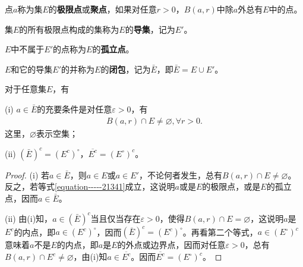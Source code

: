 \documentclass[../../main.tex]{subfiles}
\begin{document}
\begin{definition}
点\(a\)称为集\(E\)的\textbf{极限点}或\textbf{聚点}，如果对任意\(r > 0\)，\(B(a, r)\)中除\(a\)外总有\(E\)中的点。

集\(E\)的所有极限点构成的集称为\(E\)的\textbf{导集}，记为\(E'\)。

\(E\)中不属于\(E'\)的点称为\(E\)的\textbf{孤立点}。

\(E\)和它的导集\(E'\)的并称为\(E\)的\textbf{闭包}，记为\(\bar{E}\)，即\(\bar{E} = E \cup E'\)。
\end{definition}

\begin{proposition}\label{proposition:闭包的性质}
对于任意集\(E\)，有

(i) \(a \in \bar{E}\)的充要条件是对任意\(\varepsilon > 0\)，有
\begin{align}
B(a, r) \cap E \neq \varnothing,\forall r>0.\label{equation-----21341}
\end{align}
这里，\(\varnothing\)表示空集；

(ii) \((\bar{E})^c = (E^c)^\circ\)，\(\overline{E^c} = (E^\circ)^c\)。
\end{proposition}
\begin{proof}
(i) 若\(a \in \bar{E}\)，则\(a \in E\)或\(a \in E'\)，不论何者发生，总有\(B(a, r) \cap E \neq \varnothing\)。反之，若等式\eqref{equation-----21341}成立，这说明\(a\)或是\(E\)的极限点，或是\(E\)的孤立点，因而\(a \in \bar{E}\)。

(ii) 由(i)知，\(a \in (\bar{E})^c\)当且仅当存在\(\varepsilon > 0\)，使得\(B(a, r) \cap E = \varnothing\)，这说明\(a\)是\(E^c\)的内点，即\(a \in (E^c)^\circ\)，因而\((\bar{E})^c = (E^c)^\circ\)。再看第二个等式，\(a \in (E^\circ)^c\)意味着\(a\)不是\(E\)的内点，即\(a\)是\(E\)的外点或边界点，因而对任意\(\varepsilon > 0\)，总有\(B(a, r) \cap E^c \neq \varnothing\)，由(i)知\(a \in \overline{E^c}\)。因而\(\overline{E^c} = (E^\circ)^c\)。 
\end{proof}
\end{document}
